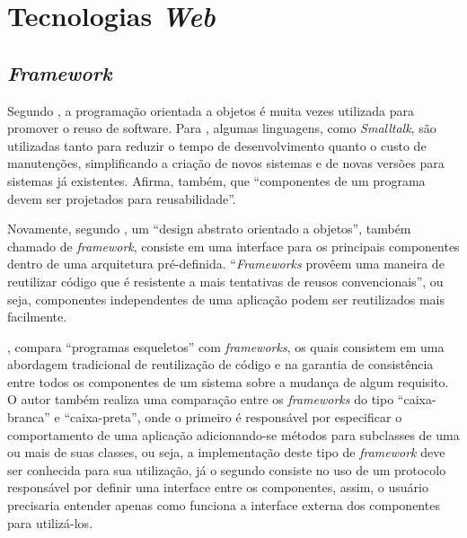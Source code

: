 \chapter{Tecnologias \textit{Web}}

\section{\textit{Framework}}
Segundo , a programação orientada a objetos é muita vezes utilizada para promover o reuso de software. Para , algumas linguagens, como \textit{Smalltalk}, são utilizadas tanto para reduzir o tempo de desenvolvimento quanto o custo de manutenções, simplificando a criação de novos sistemas e de novas versões para sistemas já existentes. Afirma, também, que ``componentes de um programa devem ser projetados para reusabilidade''.

Novamente, segundo , um ``design abstrato orientado a objetos'', também chamado de \textit{framework}, consiste em uma interface para os principais componentes dentro de uma
arquitetura pré-definida. ``\textit{Frameworks} provêem uma maneira de reutilizar código que é resistente a mais tentativas de reusos convencionais'', ou seja, componentes independentes de uma aplicação podem ser reutilizados mais facilmente.

, compara ``programas esqueletos'' com \textit{frameworks}, os quais consistem em uma abordagem tradicional de reutilização de código e na garantia de consistência entre todos os componentes de um sistema sobre a mudança de algum requisito. O autor também realiza uma comparação entre os \textit{frameworks} do tipo ``caixa-branca'' e ``caixa-preta'', onde o primeiro é responsável por especificar o comportamento de uma aplicação adicionando-se métodos para subclasses de uma ou mais de suas classes, ou seja, a implementação deste tipo de \textit{framework} deve ser conhecida para sua utilização, já o segundo consiste no uso de um protocolo responsável por definir uma interface entre os componentes, assim, o usuário precisaria entender apenas como funciona a interface externa dos componentes para utilizá-los.

